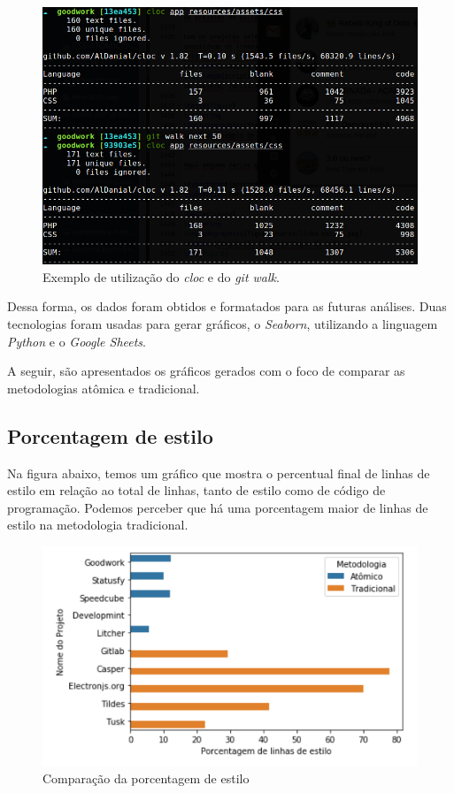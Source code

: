 \begin{figure}[H]
\centering
\includegraphics{figuras/cloc.png}
\caption{Exemplo de utilização do \emph{cloc} e do \emph{git walk}.}
\end{figure}

Dessa forma, os dados foram obtidos e formatados para as futuras análises. Duas tecnologias foram usadas para gerar gráficos, o \emph{Seaborn}, utilizando a linguagem \emph{Python} e o \emph{Google Sheets}.

A seguir, são apresentados os gráficos gerados com o foco de comparar as metodologias atômica e tradicional.

\hypertarget{porcentagem de estilo}{%
\subsection{Porcentagem de estilo}\label{parcel}}

Na figura abaixo, temos um gráfico que mostra o percentual final de linhas de estilo em relação ao total de linhas, tanto de estilo como de código de programação. Podemos perceber que há uma porcentagem maior de linhas de estilo na metodologia tradicional. 

\begin{figure}[H]
\centering
\includegraphics{figuras/barra-linha-estilo.png}
\caption{Comparação da porcentagem de estilo}
\end{figure}

